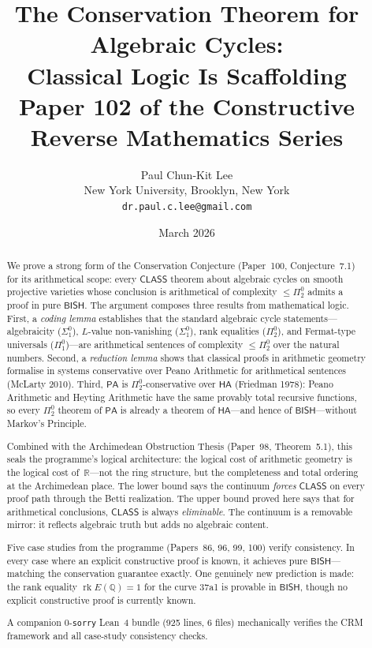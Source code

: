 \documentclass[11pt,a4paper]{article}
\title{\textbf{The Conservation Theorem for Algebraic Cycles:\\
Classical Logic Is Scaffolding}\\[6pt]
\large Paper 102 of the Constructive Reverse Mathematics Series}
\author{Paul Chun-Kit Lee\\
\small New York University, Brooklyn, New York\\
\small\texttt{dr.paul.c.lee@gmail.com}}
\date{March 2026}
\theoremstyle{plain}
\theoremstyle{definition}
\newcommand{\BISH}{\textsf{BISH}}
\newcommand{\CLASS}{\textsf{CLASS}}
\newcommand{\HA}{\textsf{HA}}
\newcommand{\PA}{\textsf{PA}}
\newcommand{\Q}{\mathbb{Q}}
\newcommand{\R}{\mathbb{R}}
\DeclareMathOperator{\rk}{rk}
\begin{document}
\maketitle

\begin{abstract}
We prove a strong form of the Conservation Conjecture (Paper~100, Conjecture~7.1) for its arithmetical scope: every $\CLASS$ theorem about algebraic cycles on smooth projective varieties whose conclusion is arithmetical of complexity $\le \Pi^0_2$ admits a proof in pure $\BISH$.  The argument composes three results from mathematical logic.  First, a \emph{coding lemma} establishes that the standard algebraic cycle statements---algebraicity ($\Sigma^0_1$), $L$-value non-vanishing ($\Sigma^0_1$), rank equalities ($\Pi^0_2$), and Fermat-type universals ($\Pi^0_1$)---are arithmetical sentences of complexity $\le \Pi^0_2$ over the natural numbers.  Second, a \emph{reduction lemma} shows that classical proofs in arithmetic geometry formalise in systems conservative over Peano Arithmetic for arithmetical sentences (McLarty 2010).  Third, $\PA$ is $\Pi^0_2$-conservative over $\HA$ (Friedman 1978): Peano Arithmetic and Heyting Arithmetic have the same provably total recursive functions, so every $\Pi^0_2$ theorem of $\PA$ is already a theorem of $\HA$---and hence of $\BISH$---without Markov's Principle.

Combined with the Archimedean Obstruction Thesis (Paper~98, Theorem~5.1), this seals the programme's logical architecture: the logical cost of arithmetic geometry is the logical cost of~$\R$---not the ring structure, but the completeness and total ordering at the Archimedean place.  The lower bound says the continuum \emph{forces} $\CLASS$ on every proof path through the Betti realization.  The upper bound proved here says that for arithmetical conclusions, $\CLASS$ is always \emph{eliminable}.  The continuum is a removable mirror: it reflects algebraic truth but adds no algebraic content.

Five case studies from the programme (Papers~86, 96, 99, 100) verify consistency.  In every case where an explicit constructive proof is known, it achieves pure $\BISH$---matching the conservation guarantee exactly.  One genuinely new prediction is made: the rank equality $\rk E(\Q) = 1$ for the curve 37a1 is provable in $\BISH$, though no explicit constructive proof is currently known.

A companion 0-\texttt{sorry} Lean~4 bundle (925 lines, 6 files) mechanically verifies the CRM framework and all case-study consistency checks.
\end{abstract}
\end{document}
